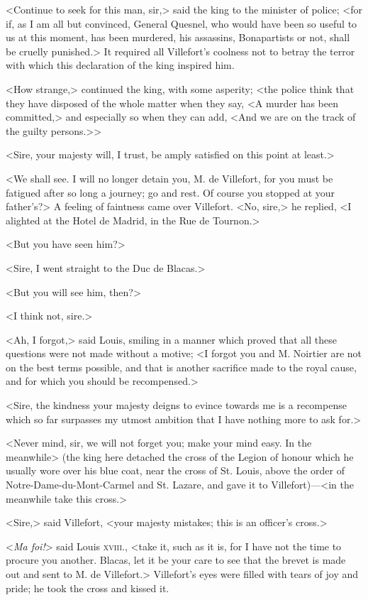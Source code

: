  <Continue to seek for this man, sir,> said the king to the minister of police; <for if, as I am all but convinced, General Quesnel, who would have been so useful to us at this moment, has been murdered, his assassins, Bonapartists or not, shall be cruelly punished.> It required all Villefort's coolness not to betray the terror with which this declaration of the king inspired him. 

 <How strange,> continued the king, with some asperity; <the police think that they have disposed of the whole matter when they say, <A murder has been committed,> and especially so when they can add, <And we are on the track of the guilty persons.>> 

 <Sire, your majesty will, I trust, be amply satisfied on this point at least.> 

 <We shall see. I will no longer detain you, M. de Villefort, for you must be fatigued after so long a journey; go and rest. Of course you stopped at your father's?> A feeling of faintness came over Villefort.  <No, sire,> he replied, <I alighted at the Hotel de Madrid, in the Rue de Tournon.> 

 <But you have seen him?> 

 <Sire, I went straight to the Duc de Blacas.> 

 <But you will see him, then?> 

 <I think not, sire.> 

 <Ah, I forgot,> said Louis, smiling in a manner which proved that all these questions were not made without a motive; <I forgot you and M. Noirtier are not on the best terms possible, and that is another sacrifice made to the royal cause, and for which you should be recompensed.> 

 <Sire, the kindness your majesty deigns to evince towards me is a recompense which so far surpasses my utmost ambition that I have nothing more to ask for.> 

 <Never mind, sir, we will not forget you; make your mind easy. In the meanwhile> (the king here detached the cross of the Legion of honour which he usually wore over his blue coat, near the cross of St. Louis, above the order of Notre-Dame-du-Mont-Carmel and St. Lazare, and gave it to Villefort)—<in the meanwhile take this cross.> 

 <Sire,> said Villefort, <your majesty mistakes; this is an officer's cross.> 

 <\textit{Ma foi!}> said Louis \textsc{xviii.}, <take it, such as it is, for I have not the time to procure you another. Blacas, let it be your care to see that the brevet is made out and sent to M. de Villefort.> Villefort's eyes were filled with tears of joy and pride; he took the cross and kissed it. 

